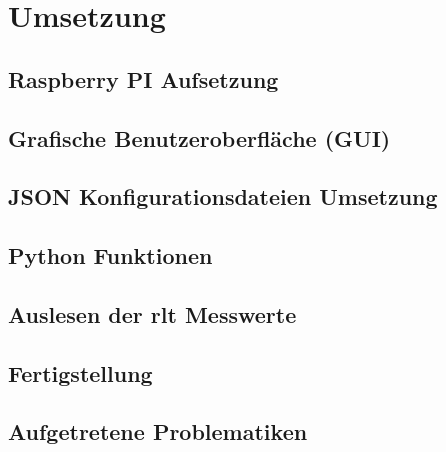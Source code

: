 \ifoot{\pezze}
\chapter{Umsetzung} 

\section{Raspberry PI Aufsetzung}


\newpage
\ifoot{\pezze}
\section{Grafische Benutzeroberfläche (GUI)}\label{gui_design}



\newpage
\ifoot{\pezze}
\section{JSON Konfigurationsdateien Umsetzung}
%


\newpage
\ifoot{\schneider}


\newpage
\ifoot{\pezze}
\section{Python Funktionen}


\newpage
\ifoot{\schneider}
\section{Auslesen der \acs{rlt} Messwerte}


\section{Fertigstellung}



\newpage
\ifoot{\pezze}



\newpage
\ifoot{\mangeng}
\section{Aufgetretene Problematiken}

